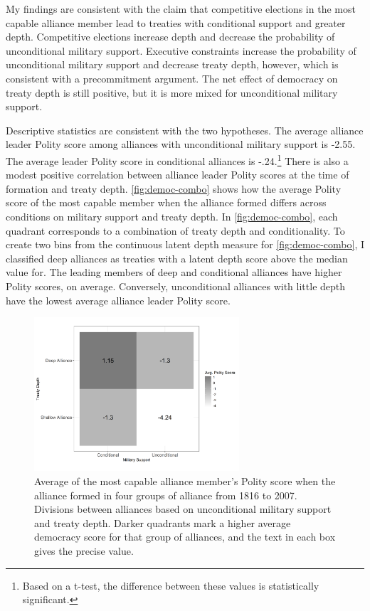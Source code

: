 \documentclass[12pt]{article}
\begin{document}
My findings are consistent with the claim that competitive elections in the most capable alliance member lead to treaties with conditional support and greater depth. 
Competitive elections increase depth and decrease the probability of unconditional military support.
Executive constraints increase the probability of unconditional military support and decrease treaty depth, however, which is consistent with a precommitment argument.
The net effect of democracy on treaty depth is still positive, but it is more mixed for unconditional military support.  


Descriptive statistics are consistent with the two hypotheses.
The average alliance leader Polity score among alliances with unconditional military support is -2.55. 
The average leader Polity score in conditional alliances is -.24.\footnote{Based on a t-test, the difference between these values is statistically significant.} 
There is also a modest positive correlation between alliance leader Polity scores at the time of formation and treaty depth. 
\autoref{fig:democ-combo} shows how the average Polity score of the most capable member when the alliance formed differs across conditions on military support and treaty depth.
In \autoref{fig:democ-combo}, each quadrant corresponds to a combination of treaty depth and conditionality. 
To create two bins from the continuous latent depth measure for \autoref{fig:democ-combo}, I classified deep alliances as treaties with a latent depth score above the median value for. 
The leading members of deep and conditional alliances have higher Polity scores, on average. 
Conversely, unconditional alliances with little depth have the lowest average alliance leader Polity score. 


\begin{figure}[hbtp]
\centering
\includegraphics[width=0.68\textwidth]{../figures/democ-combo.png}
\caption{Average of the most capable alliance member's Polity score when the alliance formed in four groups of alliance from 1816 to 2007. Divisions between alliances based on unconditional military support and treaty depth. Darker quadrants mark a higher average democracy score for that group of alliances, and the text in each box gives the precise value.}
\label{fig:democ-combo}
\end{figure}
\end{document}
